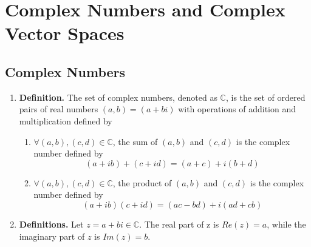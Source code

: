 \documentclass[oneside, 12pt]{book}
\newcommand{\settag}[1]{\renewcommand{\theenumi}{#1}}
\newcommand{\complex}{\mathbb{C}}
\newcommand{\tbf}[1]{\textbf{#1}}
\newcommand{\para}[1]{\item \tbf{#1}}
\begin{document}
\chapter{Complex Numbers and Complex Vector Spaces}
\section{Complex Numbers}
\begin{enumerate}
    \settag{5.1.1}
    \para{Definition.} The set of complex numbers, denoted as $\mathbb{C}$, is the set 
    of ordered pairs of real numbers $(a,b) = (a+bi)$ with operations of addition and 
    multiplication defined by
    \begin{enumerate}
        \item $\forall (a,b), (c,d)\in \mathbb{C}$, the sum of $(a,b)$ and $(c,d)$ is 
        the complex number defined by
        \begin{equation*}
            (a+ib) + (c+id) = (a+c)+i(b+d)
        \end{equation*}
        \item $\forall (a,b),(c,d) \in \mathbb{C}$, the product of $(a,b)$ and $(c,d)$ 
        is the complex number defined by
        \begin{equation*}
            (a+ib)(c+id) = (ac-bd)+i(ad+cb)
        \end{equation*}
    \end{enumerate}
    
    \settag{5.1.2}
    \para{Definitions.} Let $z = a+bi \in \complex$. The real part of z is $Re(z) = a$, 
    while the imaginary part of $z$ is $Im(z) = b$.
    

\end{enumerate}
\end{document}
